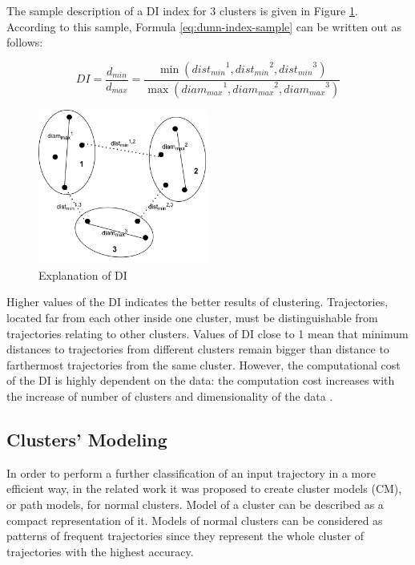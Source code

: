 The sample description of a DI index for 3 clusters is given in Figure \ref{fig:di_sample}. According to this sample, Formula \ref{eq:dunn-index-sample} can be written out as follows:

\begin{equation} \label{eq:dunn-index-sample}
DI = \frac {d_{min}} {d_{max}} = \frac
{\min ({dist_{min}}^1, {dist_{min}}^2, {dist_{min}}^3)}
{\max ({diam_{max}}^1, {diam_{max}}^2, {diam_{max}}^3)}
\end{equation}

\begin{figure}[!htb]
	\centering{}
	\includegraphics[width=0.5\textwidth]{images/di-sample.png}
	\caption{Explanation of DI}
	\label{fig:di_sample}
\end{figure}

Higher values of the DI indicates the better results of clustering. Trajectories, located far from each other inside one cluster, must be distinguishable from trajectories relating to other clusters. Values of DI close to 1 mean that minimum distances to trajectories from different clusters remain bigger than distance to farthermost trajectories from the same cluster. However, the computational cost of the DI is highly dependent on the data: the computation cost increases with the increase of number of clusters and dimensionality of the data \cite{online:dunn_cl_valid}.

\subsection{Clusters' Modeling}

In order to perform a further classification of an input trajectory in a more efficient way, in the related work it was proposed to create cluster models (CM), or path models, for normal clusters. Model of a cluster can be described as a compact representation of it. Models of normal clusters can be considered as patterns of frequent trajectories since they represent the whole cluster of trajectories with the highest accuracy. 

